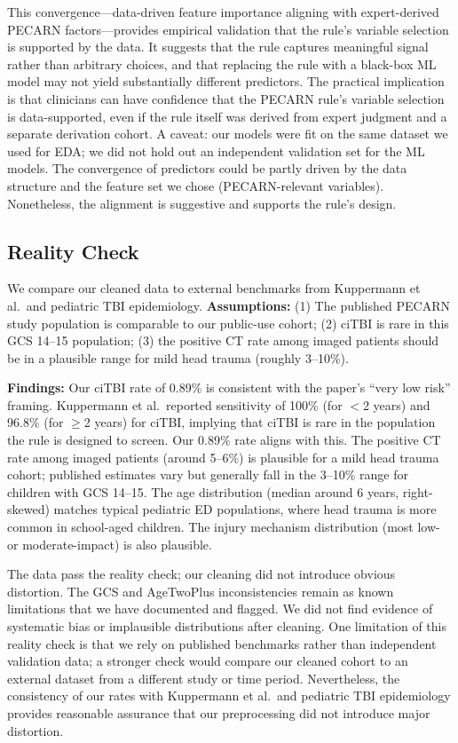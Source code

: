\documentclass[12ptpt,letterpaper]{article}
\begin{document}
This convergence---data-driven feature importance aligning with expert-derived PECARN factors---provides empirical validation that the rule's variable selection is supported by the data. It suggests that the rule captures meaningful signal rather than arbitrary choices, and that replacing the rule with a black-box ML model may not yield substantially different predictors. The practical implication is that clinicians can have confidence that the PECARN rule's variable selection is data-supported, even if the rule itself was derived from expert judgment and a separate derivation cohort. A caveat: our models were fit on the same dataset we used for EDA; we did not hold out an independent validation set for the ML models. The convergence of predictors could be partly driven by the data structure and the feature set we chose (PECARN-relevant variables). Nonetheless, the alignment is suggestive and supports the rule's design.

\subsection{Reality Check}\label{reality-check}

We compare our cleaned data to external benchmarks from Kuppermann et al.\ and pediatric TBI epidemiology. \textbf{Assumptions:} (1) The published PECARN study population is comparable to our public-use cohort; (2) ciTBI is rare in this GCS 14--15 population; (3) the positive CT rate among imaged patients should be in a plausible range for mild head trauma (roughly 3--10\%).

\textbf{Findings:} Our ciTBI rate of 0.89\% is consistent with the paper's ``very low risk'' framing. Kuppermann et al.\ reported sensitivity of 100\% (for $<$2 years) and 96.8\% (for $\ge$2 years) for ciTBI, implying that ciTBI is rare in the population the rule is designed to screen. Our 0.89\% rate aligns with this. The positive CT rate among imaged patients (around 5--6\%) is plausible for a mild head trauma cohort; published estimates vary but generally fall in the 3--10\% range for children with GCS 14--15. The age distribution (median around 6 years, right-skewed) matches typical pediatric ED populations, where head trauma is more common in school-aged children. The injury mechanism distribution (most low- or moderate-impact) is also plausible.

The data pass the reality check; our cleaning did not introduce obvious distortion. The GCS and AgeTwoPlus inconsistencies remain as known limitations that we have documented and flagged. We did not find evidence of systematic bias or implausible distributions after cleaning. One limitation of this reality check is that we rely on published benchmarks rather than independent validation data; a stronger check would compare our cleaned cohort to an external dataset from a different study or time period. Nevertheless, the consistency of our rates with Kuppermann et al.\ and pediatric TBI epidemiology provides reasonable assurance that our preprocessing did not introduce major distortion.
\end{document}
